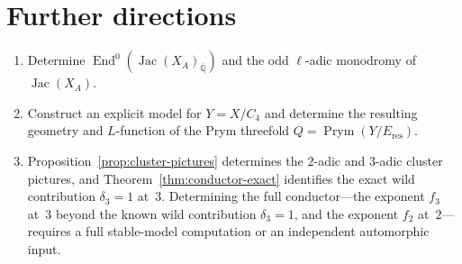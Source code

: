 \documentclass[11pt,letterpaper]{article}
\theoremstyle{plain}
\theoremstyle{remark}
\newcommand{\QQ}{\mathbb{Q}}
\newcommand{\Jac}{\operatorname{Jac}}
\newcommand{\Prym}{\operatorname{Prym}}
\newcommand{\End}{\operatorname{End}}
\begin{document}




\section{Further directions}

\begin{enumerate}
\item[(1)] Determine \(\End^0(\Jac(X_A)_{\overline{\QQ}})\) and the odd \(\ell\)-adic monodromy of \(\Jac(X_A)\).

\item[(2)] Construct an explicit model for \(Y=X/C_4\) and determine the resulting geometry and \(L\)-function of the Prym threefold \(Q=\Prym(Y/E_{\mathrm{res}})\).

\item[(3)] Proposition~\ref{prop:cluster-pictures} determines the \(2\)-adic and \(3\)-adic cluster pictures, and Theorem~\ref{thm:conductor-exact} identifies the exact wild contribution \(\delta_3=1\) at~\(3\). Determining the full conductor---the exponent \(f_3\) at~\(3\) beyond the known wild contribution \(\delta_3=1\), and the exponent \(f_2\) at~\(2\)---requires a full stable-model computation or an independent automorphic input.
\end{enumerate}
\end{document}
